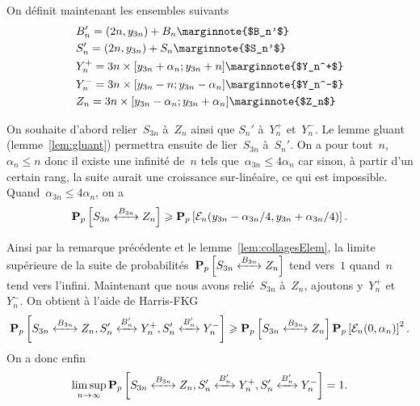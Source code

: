 	On définit maintenant les ensembles suivants
	\begin{align*}
		&B_n' = (2n, y_{3n}) + B_n \marginnote{$B_n'$} \\
		&S_n' = (2n, y_{3n}) + S_n \marginnote{$S_n'$} \\
		&Y_n^+ = {3n} \times [y_{3n} + \alpha_n; y_{3n} + n] \marginnote{$Y_n^+$} \\
		&Y_n^- = {3n} \times [y_{3n} - n; y_{3n} - \alpha_n] \marginnote{$Y_n^-$} \\
		&Z_n = {3n} \times [y_{3n} - \alpha_n; y_{3n} + \alpha_n] \marginnote{$Z_n$}
	\end{align*}
	

	On souhaite d'abord relier~$S_{3n}$ à~$Z_n$ ainsi que $S_n'$ à~$Y_n^+$ et~$Y_n^-$. Le lemme gluant (lemme~\ref{lem:gluant}) permettra ensuite de lier~$S_{3n}$ à~$S_n'$. On a pour tout~$n$, $\alpha_n \leq n$ donc il existe une infinité de~$n$ tels que~$\alpha_{3n} \leq 4\alpha_n$ car sinon, à partir d'un certain rang, la suite aurait une croissance sur-linéaire, ce qui est impossible. Quand~$\alpha_{3n} \leq 4\alpha_n$, on a
	\[
		\Pp{\relie[B_{3n}]{S_{3n}}{Z_n}} \geq \Pp{\mathcal{E}_n(y_{3n} - \alpha_{3n}/4, y_{3n} + \alpha_{3n}/4)}.
	\]

	Ainsi par la remarque précédente et le lemme~\ref{lem:collagesElem}, la limite supérieure de la suite de probabilités~$\Pp{\relie[B_{3n}]{S_{3n}}{Z_n}}$ tend vers~$1$ quand~$n$ tend vers l'infini. Maintenant que nous avons relié~$S_{3n}$ à~$Z_n$, ajoutons y~$Y_n^+$ et~$Y_n^-$. On obtient à l'aide de Harris-FKG
	\[
		\Pp{\relie[B_{3n}]{S_{3n}}{Z_n}, \relie[B_n']{S_n'}{Y_n^+}, \relie[B_n']{S_n'}{Y_n^-}} \geq \Pp{\relie[B_{3n}]{S_{3n}}{Z_n} }\Pp{\mathcal{E}_n(0, \alpha_n)}^2.
	\]
	On a donc enfin
	\[ 
		\limsup_{n \to \infty} \Pp{\relie[B_{3n}]{S_{3n}}{Z_n}, \relie[B_n']{S_n'}{Y_n^+}, \relie[B_n']{S_n'}{Y_n^-}} = 1.
	\]


